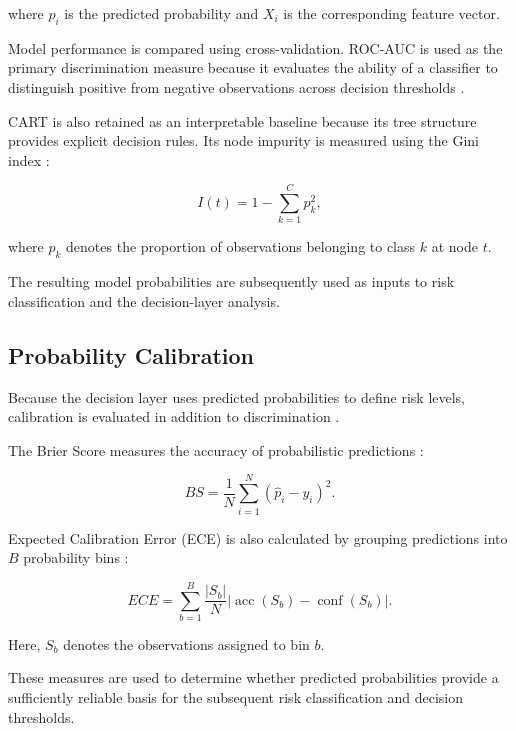 \documentclass[10pt,a4paper]{article}
\begin{document}
where $\hat{p}_i$ is the predicted probability and $X_i$ is the
corresponding feature vector.

Model performance is compared using cross-validation. ROC-AUC is used
as the primary discrimination measure because it evaluates the ability
of a classifier to distinguish positive from negative observations
across decision thresholds \cite{fawcett2006introduction}.

CART is also retained as an interpretable baseline because its tree
structure provides explicit decision rules. Its node impurity is
measured using the Gini index \cite{breiman1984classification}:

\begin{equation}
I(t)=1-\sum_{k=1}^{C}p_k^2,
\end{equation}

where $p_k$ denotes the proportion of observations belonging to class
$k$ at node $t$.

The resulting model probabilities are subsequently used as inputs to
risk classification and the decision-layer analysis.

\subsection{Probability Calibration}

Because the decision layer uses predicted probabilities to define risk
levels, calibration is evaluated in addition to discrimination
\cite{niculescu2005predicting,guo2017calibration}.

The Brier Score measures the accuracy of probabilistic predictions
\cite{brier1950verification}:

\begin{equation}
BS=\frac{1}{N}\sum_{i=1}^{N}(\hat{p}_i-y_i)^2.
\end{equation}

Expected Calibration Error (ECE) is also calculated by grouping
predictions into $B$ probability bins
\cite{naeini2015obtaining,guo2017calibration}:

\begin{equation}
ECE=
\sum_{b=1}^{B}
\frac{|S_b|}{N}
\left|
\operatorname{acc}(S_b)
-
\operatorname{conf}(S_b)
\right|.
\end{equation}

Here, $S_b$ denotes the observations assigned to bin $b$.

These measures are used to determine whether predicted probabilities
provide a sufficiently reliable basis for the subsequent risk
classification and decision thresholds.
\end{document}
